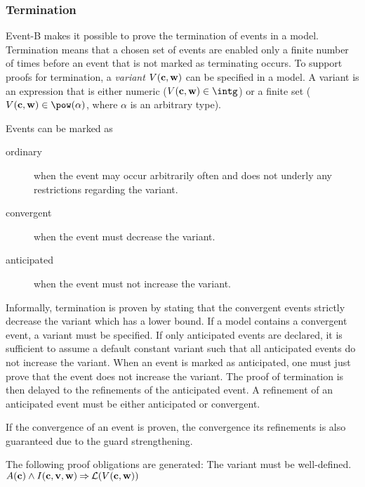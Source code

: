 \subsubsection{Termination}
\label{termination}
Event-B makes it possible to prove the termination of events in a model.
Termination means that a chosen set of events are enabled only a finite number
 of times before an event that is not marked as terminating occurs.
To support proofs for termination, a \emph{variant} $V(\mathbf{c},\mathbf{w})$ can be specified in a model.
A variant is an expression that is either numeric 
 ($V(\allconstants,\concvariables)\in\intg$) or
 a finite set ($V(\allconstants,\concvariables)\in\pow(\alpha)$,
 where $\alpha$ is an arbitrary type).

Events can be marked as
\begin{description}
\item[ordinary] when the event may occur arbitrarily often and does not underly any restrictions
  regarding the variant.
\item[convergent] when the event must decrease the variant.
\item[anticipated] when the event must not increase the variant.
\end{description}
Informally, termination is proven by stating that the convergent events strictly decrease the variant
  which has a lower bound.
If a model contains a convergent event, a variant must be specified.
If only anticipated events are declared, it is sufficient to assume a default constant variant such
  that all anticipated events do not increase the variant.
When an event is marked as anticipated, one must just prove that the event does not increase the
  variant.
The proof of termination is then delayed to the refinements of the anticipated event.
A refinement of an anticipated event must be either anticipated or convergent.

If the convergence of an event is proven, the convergence its refinements is also guaranteed due to
  the guard strengthening.

The following proof obligations are generated:
The variant must be well-defined.
%
  {$A(\mathbf{c}) \land I(\mathbf{c},\mathbf{v},\mathbf{w}) \mathbin\Rightarrow \mathcal{L}(V(\mathbf{c},\mathbf{w}))$}

